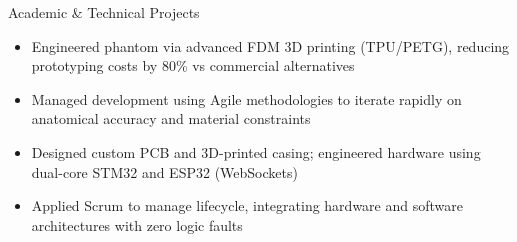 \documentclass{resume}
\begin{document}
\begin{experienceSection}{Academic \& Technical Projects}
    \projectItem[
        title={Open-Source Gastrointestinal Medical Phantom},
        duration={Ago-Dic 2025 – Feb-Jun 2026},
        keyHighlight={Agile methodologies, Advanced FDM}
    ]
    \begin{itemize}
        \vspace{-0.5em}
        \itemsep -6pt {}
        \item Engineered phantom via advanced FDM 3D printing (TPU/PETG), reducing prototyping costs by 80\% vs commercial alternatives
        \item Managed development using Agile methodologies to iterate rapidly on anatomical accuracy and material constraints
    \end{itemize}
    \projectItem[
        title={DigiMix},
        duration={Ago-Dic 2024},
        keyHighlight={Embedded Systems, Scrum}
    ]
    \begin{itemize}
        \vspace{-0.5em}
        \itemsep -6pt {}
        \item Designed custom PCB and 3D-printed casing; engineered hardware using dual-core STM32 and ESP32 (WebSockets)
        \item Applied Scrum to manage lifecycle, integrating hardware and software architectures with zero logic faults
    \end{itemize}
\end{experienceSection}
\end{document}
